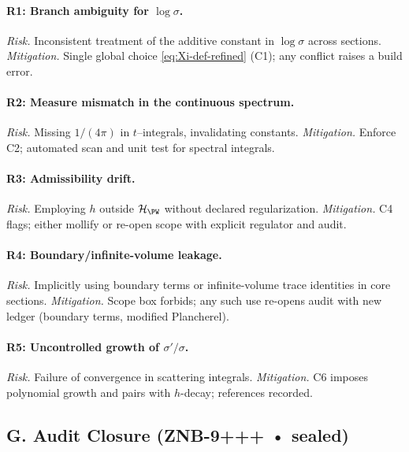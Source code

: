 \paragraph{R1: Branch ambiguity for $\log\sigma$.}
\emph{Risk.} Inconsistent treatment of the additive constant in $\log\sigma$ across sections.
\emph{Mitigation.} Single global choice \eqref{eq:Xi-def-refined} (C1); any conflict raises a build error.

\paragraph{R2: Measure mismatch in the continuous spectrum.}
\emph{Risk.} Missing $1/(4\pi)$ in $t$–integrals, invalidating constants.
\emph{Mitigation.} Enforce C2; automated scan and unit test for spectral integrals.

\paragraph{R3: Admissibility drift.}
\emph{Risk.} Employing $h$ outside $\mathcal H_{\PW}$ without declared regularization.
\emph{Mitigation.} C4 flags; either mollify or re-open scope with explicit regulator and audit.

\paragraph{R4: Boundary/infinite-volume leakage.}
\emph{Risk.} Implicitly using boundary terms or infinite-volume trace identities in core sections.
\emph{Mitigation.} Scope box forbids; any such use re-opens audit with new ledger (boundary terms, modified Plancherel).

\paragraph{R5: Uncontrolled growth of $\sigma'/\sigma$.}
\emph{Risk.} Failure of convergence in scattering integrals.
\emph{Mitigation.} C6 imposes polynomial growth and pairs with $h$-decay; references \cite{Hejhal1983II,Iwaniec2002} recorded.


\subsection*{G. Audit Closure (ZNB-9+++ • sealed)}
\label{subsec:audit-closure-refined}

